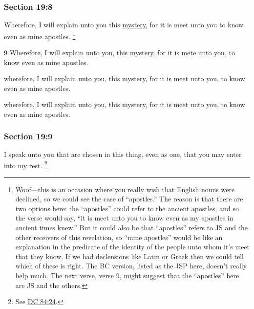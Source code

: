	\subsubsection{Section 19:8} %
		\label{DC19-8}

		Wherefore, I will explain unto you this \hyperref[MYSTERY]{mystery}, for it is meet unto you to know even as mine apostles.%
		\footnote{%
			Woof---this is an occasion where you really wish that English nouns were declined, so we could see the case of ``apostles.'' The reason is that there are two options here: the ``apostles'' could refer to the ancient apostles, and so the verse would say, ``it is meet unto you to know even as my apostles in ancient times knew.'' But it could also be that ``apostles'' refers to JS and the other receivers of this revelation, so ``mine apostles'' would be like an explanation in the predicate of the identity of the people unto whom it's meet that they know. If we had declensions like Latin or Greek then we could tell which of these is right. The BC version, listed as the JSP here, doesn't really help much. The next verse, verse 9, might suggest that the ``apostles'' here are JS and the others.
			}

		\begin{framed}
		\scriptsize
			\begin{compactdesc}
				\item[JSP] 9 Wherefore, I will explain unto you, this mystery, for it is mete unto you, to know even as mine apostles.
				\item[RB1] [\textit{missing}]
				\item[DC 1835] wherefore, I will explain unto you, this mystery, for it is meet unto you, to know even as mine apostles. 
				\item[DC 1844] wherefore, I will explain unto you, this mystery, for it is meet unto you, to know even as mine apostles. 
			\end{compactdesc}
		\end{framed}

	\subsubsection{Section 19:9} %
		\label{DC19-9}

		I speak unto you that are chosen in this thing, even as one, that you may enter into my rest.%
			\footnote{%
				See \hyperref[DC84-24]{DC 84:24}.
				}


